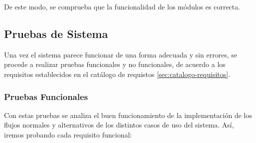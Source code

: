 De este modo, se comprueba que la funcionalidad de los módulos es correcta.


\subsection{Pruebas de Sistema}

Una vez el sistema parece funcionar de una forma adecuada y sin errores, se procede a realizar pruebas funcionales y no funcionales, de acuerdo a los requisitos establecidos en el catálogo de requistos \ref{sec:catalogo-requisitos}. 


\subsubsection{Pruebas Funcionales}

Con estas pruebas se analiza el buen funcionamiento de la implementación de los flujos normales y alternativos de los distintos casos de uso del sistema. Así, iremos probando cada requisito funcional: 

